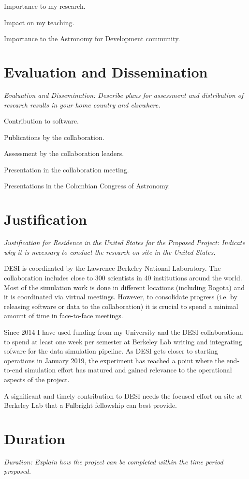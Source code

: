 \documentclass[12pt]{article}
\begin{document}
Importance to my research.

Impact on my teaching.

Importance to the Astronomy for Development community.

\section*{Evaluation and Dissemination}
\textit{Evaluation and Dissemination: Describe plans for assessment and
distribution of research results in your home country and elsewhere.}

Contribution to software.

Publications by the collaboration.

Assessment by the collaboration leaders. 

Presentation in the collaboration meeting.

Presentations in the Colombian Congress of Astronomy. 



\section*{Justification}
\textit{Justification for Residence in the United States for the Proposed
Project: Indicate why it is necessary to conduct the research on site
 in the United States. }

DESI is coordinated by the Lawrence Berkeley National Laboratory. The
collaboration includes close to 300 scientists in 40 institutions
around the world. 
Most of the simulation work is done in different locations (including
Bogota) and it is coordinated via virtual meetings.  
However, to consolidate progress (i.e. by releasing software or data
to the collaboration) it is crucial to spend a minimal amount of time
in face-to-face meetings. 

Since 2014 I have used funding from my University and the DESI
collaborationn to spend at least one week per semester at
Berkeley Lab writing and integrating sofware for the data simulation
pipeline. 
As DESI gets closer to starting operations in January 2019, the
experiment has reached a point where the end-to-end simulation effort
has matured and gained relevance to the operational aspects of the
project. 

A significant and timely contribution to DESI needs the focused effort on
site at Berkeley Lab that a Fulbright fellowship can best provide. 

\section*{Duration}
\textit{ Duration: Explain how the project can be completed within the time
period proposed. }
\end{document}
